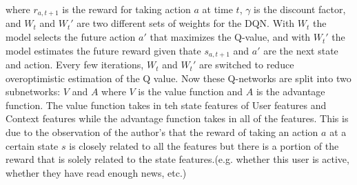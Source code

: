 \documentclass{ieeetj}
\begin{document}
where $r_{a, t+1}$ is the reward for taking action $a$ at time $t$, $\gamma$ is the discount factor, and $W_t$ and $W_t'$ are two different sets of weights for the DQN. With $W_t$ the model selects the future action $a'$ that maximizes the Q-value, and with $W_t'$ the model estimates the future reward given thate $s_{a, t+1}$ and $a'$ are the next state and action. Every few iterations, $W_t$ and $W_t'$ are switched to reduce overoptimistic estimation of the Q value. Now these Q-networks are split into two subnetworks: $V$ and $A$ where $V$ is the value function and $A$ is the advantage function. The value function takes in teh state features of User features and Context features while the advantage function takes in all of the features. This is due to the observation of the author's that the reward of taking an action $a$ at a certain state $s$ is closely related to all the features but there is a portion of the reward that is solely related to the state features.(e.g. whether this user is active, whether they have read enough news, etc.) 
	


\end{document}

